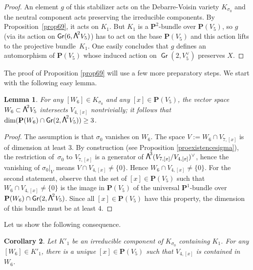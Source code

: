 \documentclass[JEP,XML,SOM,Unicode, NoEqCountersInSection,NoFloatCountersInSection]{cedram}
\newtheorem{lemm}{Lemma}[section]
\newtheorem{coro}[lemm]{Corollary}
\theoremstyle{definition}
\renewcommand\P{{\mathbf P}}\let\PP\P
\DeclareMathOperator{\Gr}{\mathsf{Gr}}
\let\dual\vee
\newcommand\bw[1]{{\hbox{\large$\mathsf{\Lambda}$}^{\!#1}}}
\begin{document}
\begin{proof}
An element $g$ of this stabilizer acts on the Debarre-Voisin variety
$K_{\sigma_0}$ and the neutral component acts preserving the irreducible components. By Proposition~\ref{prop69}, it acts on $K_1$. But
$K_1$ is a $\P^2$-bundle over $\P(V_5)$, so $g$ (via its action
on $\Gr(6,\bw2V_5)$) has to act on
the base $\P(V_5)$ and this action lifts to the projective bundle~$K_1$.
One easily concludes that $g$ defines an automorphism of $\P(V_5)$ whose induced action on $\Gr(2,V_5^\dual)$
preserves $X$.
\end{proof}

The proof of Proposition \ref{prop69} will use a few more preparatory steps.
We start with the
following easy lemma.

\begin{lemm}\label{lepourV6dansKsigma0}
For any $[W_6]\in K_{\sigma_0}$ and any
$[x]\in \P(V_5)$,
the vector space $W_6\subset \bw2V_5$ intersects $V_{4,[x]}$ nontrivially; it follows that $\dim (\P(W_6)\cap \Gr(2, \bw2V_5))\geq 3$.
\end{lemm}

\begin{proof} The assumption is that $\sigma_0$ vanishes on $W_6$. The space
$V:=W_{6}\cap V_{7,[x]}$ is of dimension at least $3$. By construction
(see Proposition \ref{proexistencesigma}), the restriction of~$\sigma_0$ to
$V_{7,[x]}$ is a generator of $\bw{3}(V_{7,[x]}/V_{4,[x]})^\dual$, hence the vanishing of
$\sigma_0\vert_{V}$ means \hbox{$V\cap V_{4,[x]}\ne \{0\}$}. Hence $W_6\cap V_{4,[x]}\ne \{0\}$. For the second statement, observe that the set of
$[x]\!\in\!\P(V_5)$ such that~\hbox{$W_6\!\cap\!V_{4,[x]}\!\ne\!\{0\}$} is the image in
$\P(V_5)$ of the universal $\P^1$-bundle over $\P(W_6)\cap\nobreak \Gr(2, \bw2V_5)$.
Since all $[x]\in \P(V_5)$ have this property, the dimension of this bundle must be at least $4$.
\end{proof}

Let us show the following consequence.

\begin{coro} \label{coropourKsigma01007}
Let $K'_1$ be an irreducible component of $K_{\sigma_0}$ containing $K_1$. For any $[W_6]\in K'_1$, there is
a unique $[x]\in \P(V_5)$ such that $V_{4,[x]} $ is contained in $W_6$.
\end{coro}
\end{document}
